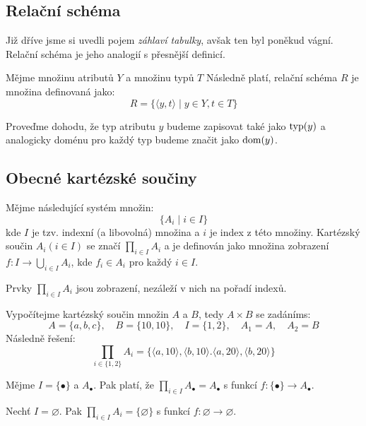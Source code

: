 \subsection{Relační schéma}
Již dříve jsme si uvedli pojem \textit{záhlaví tabulky}, avšak ten byl poněkud vágní. Relační schéma je jeho analogií s přesnější definicí.
\begin{uptheorem}
Mějme množinu atributů $Y$ a množinu typů $T$ Následně platí, relační schéma $R$ je množina definovaná jako:
$$
R = \lbrace \langle y, t \rangle \; | \; y \in Y, t \in T \rbrace
$$
\end{uptheorem}
Proveďme dohodu, že typ atributu $y$ budeme zapisovat také jako $\operatorname{typ}(y)$ a analogicky doménu pro každý typ budeme značit jako $\operatorname{dom}(y)$.

\subsection{Obecné kartézské součiny}
Mějme následující systém množin:
$$
\lbrace A_{i} \; | \; i \in I \rbrace
$$
kde $I$ je tzv. indexní (a libovolná) množina a $i$ je index z této množiny. Kartézský součin $A_{i} (i \in I)$ se značí $\prod_{i \in I} A_{i}$ a je definován jako množina zobrazení $f: I \rightarrow \bigcup_{i \in I} A_{i}$, kde $f_{i} \in A_{i}$ pro každý $i \in I$.

Prvky $\prod_{i \in I} A_{i}$ jsou zobrazení, nezáleží v nich na pořadí indexů.
\begin{upexample}
Vypočítejme kartézský součin množin $A$ a $B$, tedy $A \times B$ se zadáníms:
$$
A = \lbrace a, b, c \rbrace, \quad B = \lbrace 10, 10 \rbrace, \quad I = \lbrace 1, 2 \rbrace, \quad A_{1} = A, \quad A_{2} = B
$$
Následně řešení:
$$
\prod_{i \in \lbrace 1, 2 \rbrace} A_{i} = \lbrace \langle a, 10 \rangle, \langle b, 10 \rangle. \langle a, 20 \rangle, \langle b, 20 \rangle \rbrace
$$
\end{upexample}

\begin{upexample}
Mějme $I = \lbrace \bullet \rbrace$ a $A_{\bullet}$. Pak platí, že $\prod_{i \in I} A_{\bullet} = A_{\bullet}$ s funkcí $f: \lbrace \bullet \rbrace \rightarrow A_{\bullet}$.
\end{upexample}

\begin{upexample}
Nechť $I = \varnothing$. Pak $\prod_{i \in I} A_{i} = \lbrace \varnothing \rbrace$ s funkcí $f: \varnothing \rightarrow \varnothing$.
\end{upexample}

